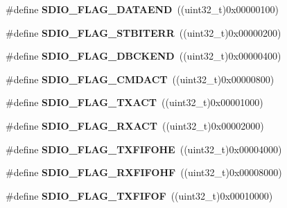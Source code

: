 \begin{DoxyCompactItemize}
\item 
\hypertarget{group__SDIO__Flags_gaaacb2f6207c149e05f8bdd70e5d49926}{
\#define {\bfseries SDIO\_\-FLAG\_\-DATAEND}~((uint32\_\-t)0x00000100)}
\label{group__SDIO__Flags_gaaacb2f6207c149e05f8bdd70e5d49926}

\item 
\hypertarget{group__SDIO__Flags_gae83f7cb3fa1183898131f3de47c2333e}{
\#define {\bfseries SDIO\_\-FLAG\_\-STBITERR}~((uint32\_\-t)0x00000200)}
\label{group__SDIO__Flags_gae83f7cb3fa1183898131f3de47c2333e}

\item 
\hypertarget{group__SDIO__Flags_ga5452d8033567821709bd7d5f06547b70}{
\#define {\bfseries SDIO\_\-FLAG\_\-DBCKEND}~((uint32\_\-t)0x00000400)}
\label{group__SDIO__Flags_ga5452d8033567821709bd7d5f06547b70}

\item 
\hypertarget{group__SDIO__Flags_gad12a9b2bd30e7b907cbabfd92fc645b3}{
\#define {\bfseries SDIO\_\-FLAG\_\-CMDACT}~((uint32\_\-t)0x00000800)}
\label{group__SDIO__Flags_gad12a9b2bd30e7b907cbabfd92fc645b3}

\item 
\hypertarget{group__SDIO__Flags_gad5d075c98012586b169ec131aab2eeb5}{
\#define {\bfseries SDIO\_\-FLAG\_\-TXACT}~((uint32\_\-t)0x00001000)}
\label{group__SDIO__Flags_gad5d075c98012586b169ec131aab2eeb5}

\item 
\hypertarget{group__SDIO__Flags_gacc935dd830338970890a05922dff8ab7}{
\#define {\bfseries SDIO\_\-FLAG\_\-RXACT}~((uint32\_\-t)0x00002000)}
\label{group__SDIO__Flags_gacc935dd830338970890a05922dff8ab7}

\item 
\hypertarget{group__SDIO__Flags_gae9277461d3c8984dc31af318e2df1959}{
\#define {\bfseries SDIO\_\-FLAG\_\-TXFIFOHE}~((uint32\_\-t)0x00004000)}
\label{group__SDIO__Flags_gae9277461d3c8984dc31af318e2df1959}

\item 
\hypertarget{group__SDIO__Flags_ga8c5942ae3df21efad2d7c61a46015758}{
\#define {\bfseries SDIO\_\-FLAG\_\-RXFIFOHF}~((uint32\_\-t)0x00008000)}
\label{group__SDIO__Flags_ga8c5942ae3df21efad2d7c61a46015758}

\item 
\hypertarget{group__SDIO__Flags_gad3ca936300ef251639a4cfbe2f63b6b8}{
\#define {\bfseries SDIO\_\-FLAG\_\-TXFIFOF}~((uint32\_\-t)0x00010000)}
\label{group__SDIO__Flags_gad3ca936300ef251639a4cfbe2f63b6b8}


\end{DoxyCompactItemize}
